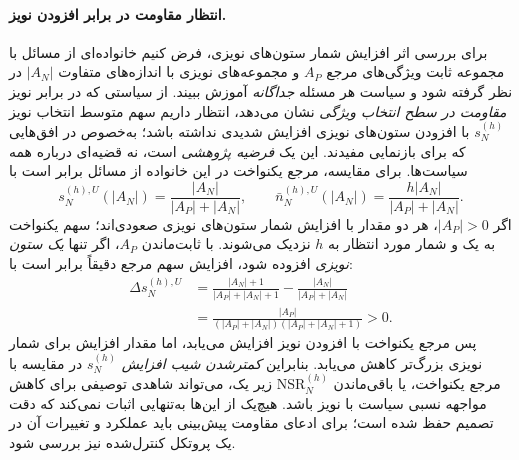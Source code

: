 \paragraph{انتظار مقاومت در برابر افزودن نویز.}
برای بررسی اثر افزایش شمار ستون‌های نویزی،
فرض کنیم خانواده‌ای از مسائل با مجموعه
ثابت ویژگی‌های مرجع $A_P$ و
مجموعه‌های نویزی با اندازه‌های متفاوت
$|A_N|$ در نظر گرفته شود و سیاست هر مسئله
\emph{جداگانه} آموزش ببیند.
از سیاستی که در برابر نویز
\emph{مقاومت در سطح انتخاب ویژگی}
نشان می‌دهد، انتظار داریم
سهم متوسط انتخاب نویز
$s_N^{(h)}$ با افزودن ستون‌های نویزی
افزایش شدیدی نداشته باشد؛
به‌خصوص در افق‌هایی که برای
بازنمایی مفیدند.
این یک \emph{فرضیه پژوهشی} است،
نه قضیه‌ای درباره همه سیاست‌ها.
برای مقایسه، مرجع یکنواخت
در این خانواده از مسائل برابر است با
\begin{equation}\label{cmp:eq:ch3-noise-resistance-uniform-growth}
\boxed{
s_N^{(h),U}(|A_N|)
=\frac{|A_N|}{|A_P|+|A_N|},
\qquad
\bar n_N^{(h),U}(|A_N|)
=\frac{h|A_N|}{|A_P|+|A_N|}.
}
\end{equation}
اگر $|A_P|>0$، هر دو مقدار
با افزایش شمار ستون‌های نویزی
صعودی‌اند؛ سهم یکنواخت
به یک و شمار مورد انتظار
به $h$ نزدیک می‌شوند.
با ثابت‌ماندن $A_P$،
اگر تنها \emph{یک ستون نویزی}
افزوده شود، افزایش سهم مرجع
دقیقاً برابر است با:
\begin{equation}\label{cmp:eq:ch3-noise-uniform-growth-derivative}
\boxed{
\begin{aligned}
\Delta s_N^{(h),U}
&=\frac{|A_N|+1}{|A_P|+|A_N|+1}
-\frac{|A_N|}{|A_P|+|A_N|}\\
&=\frac{|A_P|}
{(|A_P|+|A_N|)(|A_P|+|A_N|+1)}>0.
\end{aligned}}
\end{equation}
پس مرجع یکنواخت با
افزودن نویز افزایش می‌یابد،
اما مقدار افزایش برای
شمار نویزی بزرگ‌تر کاهش می‌یابد.
بنابراین \emph{کمترشدن شیب افزایش}
$s_N^{(h)}$ در مقایسه با مرجع
یکنواخت، یا باقی‌ماندن
$\mathrm{NSR}_N^{(h)}$ زیر یک،
می‌تواند شاهدی توصیفی برای
کاهش مواجهه نسبی سیاست
با نویز باشد. هیچ‌یک از این‌ها
به‌تنهایی اثبات نمی‌کند که
دقت تصمیم حفظ شده است؛
برای ادعای مقاومت پیش‌بینی
باید عملکرد و تغییرات آن
در یک پروتکل کنترل‌شده نیز
بررسی شود.


